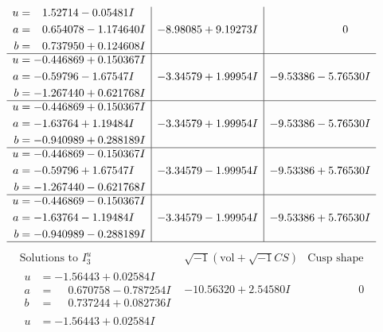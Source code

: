 \documentclass[1p]{elsarticle_modified}
\theoremstyle{definition}
\newcommand{\I}{\sqrt{-1}}
\begin{document}
$$\begin{array}{c|c|c}
\begin{aligned}
u &= \phantom{-}1.52714 - 0.05481 I \\
a &= \phantom{-}0.654078 - 1.174640 I \\
b &= \phantom{-}0.737950 + 0.124608 I\end{aligned}
 & -8.98085 + 9.19273 I & \phantom{-0.000000 } 0 \\ \hline\begin{aligned}
u &= -0.446869 + 0.150367 I \\
a &= -0.59796 - 1.67547 I \\
b &= -1.267440 + 0.621768 I\end{aligned}
 & -3.34579 + 1.99954 I & -9.53386 - 5.76530 I \\ \hline\begin{aligned}
u &= -0.446869 + 0.150367 I \\
a &= -1.63764 + 1.19484 I \\
b &= -0.940989 + 0.288189 I\end{aligned}
 & -3.34579 + 1.99954 I & -9.53386 - 5.76530 I \\ \hline\begin{aligned}
u &= -0.446869 - 0.150367 I \\
a &= -0.59796 + 1.67547 I \\
b &= -1.267440 - 0.621768 I\end{aligned}
 & -3.34579 - 1.99954 I & -9.53386 + 5.76530 I \\ \hline\begin{aligned}
u &= -0.446869 - 0.150367 I \\
a &= -1.63764 - 1.19484 I \\
b &= -0.940989 - 0.288189 I\end{aligned}
 & -3.34579 - 1.99954 I & -9.53386 + 5.76530 I\\
 \hline 
 \end{array}$$\newpage$$\begin{array}{c|c|c}  
\text{Solutions to }I^u_{3}& \I (\text{vol} + \sqrt{-1}CS) & \text{Cusp shape}\\
 \hline 
\begin{aligned}
u &= -1.56443 + 0.02584 I \\
a &= \phantom{-}0.670758 - 0.787254 I \\
b &= \phantom{-}0.737244 + 0.082736 I\end{aligned}
 & -10.56320 + 2.54580 I & \phantom{-0.000000 } 0 \\ \hline\begin{aligned}
u &= -1.56443 + 0.02584 I \\

\end{aligned}
\end{array}$$
\end{document}
